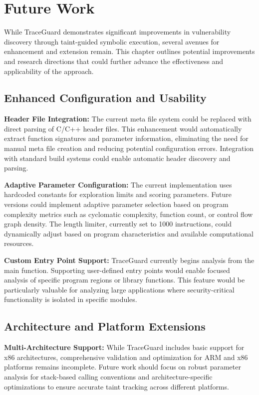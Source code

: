 \chapter{Future Work}

While TraceGuard demonstrates significant improvements in vulnerability discovery through taint-guided symbolic execution, several avenues for enhancement and extension remain. This chapter outlines potential improvements and research directions that could further advance the effectiveness and applicability of the approach.

\section{Enhanced Configuration and Usability}

\textbf{Header File Integration:} The current meta file system could be replaced with direct parsing of C/C++ header files. This enhancement would automatically extract function signatures and parameter information, eliminating the need for manual meta file creation and reducing potential configuration errors. Integration with standard build systems could enable automatic header discovery and parsing.

\textbf{Adaptive Parameter Configuration:} The current implementation uses hardcoded constants for exploration limits and scoring parameters. Future versions could implement adaptive parameter selection based on program complexity metrics such as cyclomatic complexity, function count, or control flow graph density. The length limiter, currently set to 1000 instructions, could dynamically adjust based on program characteristics and available computational resources.

\textbf{Custom Entry Point Support:} TraceGuard currently begins analysis from the main function. Supporting user-defined entry points would enable focused analysis of specific program regions or library functions. This feature would be particularly valuable for analyzing large applications where security-critical functionality is isolated in specific modules.

\section{Architecture and Platform Extensions}

\textbf{Multi-Architecture Support:} While TraceGuard includes basic support for x86 architectures, comprehensive validation and optimization for ARM and x86 platforms remains incomplete. Future work should focus on robust parameter analysis for stack-based calling conventions and architecture-specific optimizations to ensure accurate taint tracking across different platforms.

